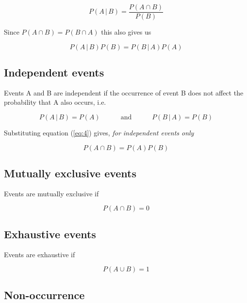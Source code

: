 \documentclass[a5paper]{article}
\begin{document}
\begin{equation} \label{eq:4}
  P(A\,|\,B) = \frac{P(A\cap B)}{P(B)}
\end{equation}

Since $P(A\cap B) = P(B\cap A)$ this also gives us

\begin{equation} \label{eq:5}
  P(A\,|\,B)P(B) = P(B\,|\,A)P(A)
\end{equation}
\subsection{Independent events}

Events A and B are independent if the occurrence of event B does not affect the
probability that A also occurs, i.e.

\begin{equation}
  P(A\,|\,B) = P(A)\hspace{3em} \mathrm{and}\hspace{3em} P(B\,|\,A) = P(B)
\end{equation}

Substituting equation (\ref{eq:4}) gives, \textit{for independent events only}

\begin{equation}
  P(A\cap B) = P(A)P(B)
\end{equation}

\subsection{Mutually exclusive events}

Events are mutually exclusive if

\begin{equation}
  P(A\cap B) = 0
\end{equation}

\subsection{Exhaustive events}

Events are exhaustive if

\begin{equation}
  P(A\cup B) = 1
\end{equation}

\subsection{Non-occurrence}
\end{document}
